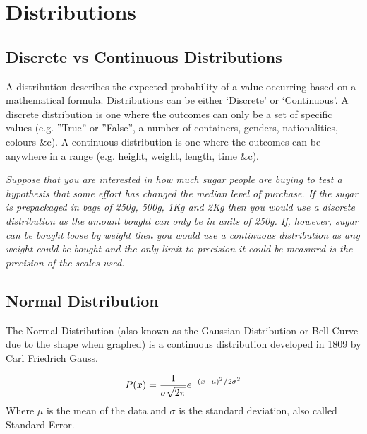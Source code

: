 \chapter{Distributions}

\section{Discrete vs Continuous Distributions}
A distribution describes the expected probability of a value occurring based on a mathematical formula.  Distributions can be either `Discrete' or `Continuous'.  A discrete distribution is one where the outcomes can only be a set of specific values (e.g. ''True'' or ''False'', a number of containers, genders, nationalities, colours \&c).  A continuous distribution is one where the outcomes can be anywhere in a range (e.g. height, weight, length, time \&c).

\emph{Suppose that you are interested in how much sugar people are buying to test a hypothesis that some effort has changed the median level of purchase.  If the sugar is prepackaged in bags of 250g, 500g, 1Kg and 2Kg then you would use a discrete distribution as the amount bought can only be in units of 250g.  If, however, sugar can be bought loose by weight then you would use a continuous distribution as any weight could be bought and the only limit to precision it could be measured is the precision of the scales used.}

\section{Normal Distribution}
The Normal Distribution
(also known as the Gaussian Distribution  or 
Bell Curve due to the shape when graphed) is a continuous distribution developed in 1809 by Carl Friedrich Gauss.

\begin{equation}
    P(x) = \frac{1}{{\sigma \sqrt {2\pi } }}e^{{{ - \left( {x - \mu } \right)^2 } \mathord{\left/ {\vphantom {{ - \left( {x - \mu } \right)^2 } {2\sigma ^2 }}} \right. \kern-\nulldelimiterspace} {2\sigma ^2 }}}
\end{equation}
Where $\mu$  is the mean of the data and $\sigma$ is the standard deviation, also called Standard Error.

